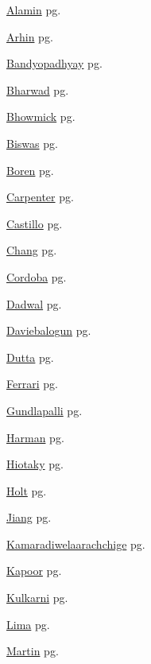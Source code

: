 \item \hyperlink{Alamin.1}{Alamin} pg. \pageref{abs:Alamin}
\item \hyperlink{Arhin.1}{Arhin} pg. \pageref{abs:Arhin}
\item \hyperlink{Bandyopadhyay.1}{Bandyopadhyay} pg. \pageref{abs:Bandyopadhyay}
\item \hyperlink{Bharwad.1}{Bharwad} pg. \pageref{abs:Bharwad}
\item \hyperlink{Bhowmick.1}{Bhowmick} pg. \pageref{abs:Bhowmick}
\item \hyperlink{Biswas.1}{Biswas} pg. \pageref{abs:Biswas}
\item \hyperlink{Boren.1}{Boren} pg. \pageref{abs:Boren}
\item \hyperlink{Carpenter.1}{Carpenter} pg. \pageref{abs:Carpenter}
\item \hyperlink{Castillo.1}{Castillo} pg. \pageref{abs:Castillo}
\item \hyperlink{Chang.1}{Chang} pg. \pageref{abs:Chang}
\item \hyperlink{Cordoba.1}{Cordoba} pg. \pageref{abs:Cordoba}
\item \hyperlink{Dadwal.1}{Dadwal} pg. \pageref{abs:Dadwal}
\item \hyperlink{Daviebalogun.1}{Daviebalogun} pg. \pageref{abs:Daviebalogun}
\item \hyperlink{Dutta.1}{Dutta} pg. \pageref{abs:Dutta}
\item \hyperlink{Ferrari.1}{Ferrari} pg. \pageref{abs:Ferrari}
\item \hyperlink{Gundlapalli.1}{Gundlapalli} pg. \pageref{abs:Gundlapalli}
\item \hyperlink{Harman.1}{Harman} pg. \pageref{abs:Harman}
\item \hyperlink{Hiotaky.1}{Hiotaky} pg. \pageref{abs:Hiotaky}
\item \hyperlink{Holt.1}{Holt} pg. \pageref{abs:Holt}
\item \hyperlink{Jiang.1}{Jiang} pg. \pageref{abs:Jiang}
\item \hyperlink{Kamaradiwelaarachchige.1}{Kamaradiwelaarachchige} pg. \pageref{abs:Kamaradiwelaarachchige}
\item \hyperlink{Kapoor.1}{Kapoor} pg. \pageref{abs:Kapoor}
\item \hyperlink{Kulkarni.1}{Kulkarni} pg. \pageref{abs:Kulkarni}
\item \hyperlink{Lima.1}{Lima} pg. \pageref{abs:Lima}
\item \hyperlink{Martin.1}{Martin} pg. \pageref{abs:Martin}
